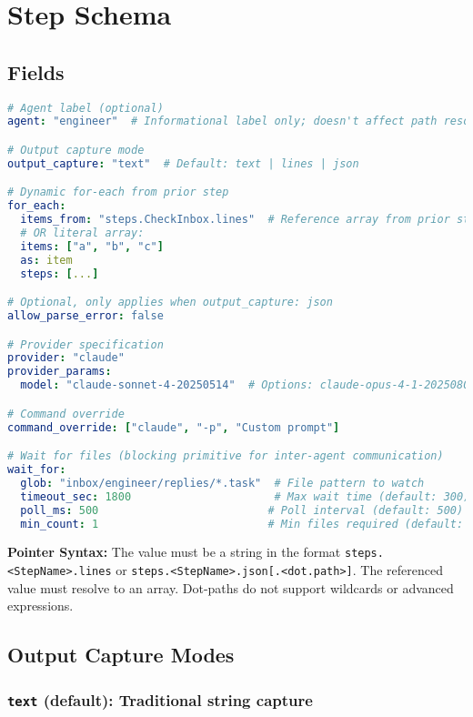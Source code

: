 \documentclass[11pt,a4paper]{article}
\begin{document}
\section{Step Schema}

\subsection{Fields}

\begin{lstlisting}[language=yaml, caption={Step Schema Fields}]
# Agent label (optional)
agent: "engineer"  # Informational label only; doesn't affect path resolution

# Output capture mode
output_capture: "text"  # Default: text | lines | json

# Dynamic for-each from prior step
for_each:
  items_from: "steps.CheckInbox.lines"  # Reference array from prior step
  # OR literal array:
  items: ["a", "b", "c"]
  as: item
  steps: [...]

# Optional, only applies when output_capture: json
allow_parse_error: false

# Provider specification
provider: "claude"
provider_params:
  model: "claude-sonnet-4-20250514"  # Options: claude-opus-4-1-20250805

# Command override
command_override: ["claude", "-p", "Custom prompt"]

# Wait for files (blocking primitive for inter-agent communication)
wait_for:
  glob: "inbox/engineer/replies/*.task"  # File pattern to watch
  timeout_sec: 1800                      # Max wait time (default: 300)
  poll_ms: 500                          # Poll interval (default: 500)
  min_count: 1                          # Min files required (default: 1)
\end{lstlisting}

\textbf{Pointer Syntax:} The value must be a string in the format \texttt{steps.<StepName>.lines} or \texttt{steps.<StepName>.json[.<dot.path>]}. The referenced value must resolve to an array. Dot-paths do not support wildcards or advanced expressions.

\subsection{Output Capture Modes}

\subsubsection{\texttt{text} (default): Traditional string capture}
\end{document}
